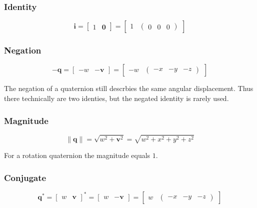 \documentclass[a4paper,11pt]{article}
\begin{document}
\subsubsection{Identity}

$$
\textbf{i}=\begin{bmatrix}
	1 & \textbf{0}
\end{bmatrix}=\begin{bmatrix}
	1 & \begin{pmatrix}
		0 & 0 & 0
	\end{pmatrix}
\end{bmatrix}
$$

\subsubsection{Negation}

$$-\textbf{q}=\begin{bmatrix}
	-w & -\textbf{v}
\end{bmatrix}=\begin{bmatrix}
	-w & \begin{pmatrix}
		-x & -y & -z
	\end{pmatrix}
\end{bmatrix}$$

The negation of a quaternion still descrbies the same angular displacement. Thus there technically are two identies, but the negated identity is rarely used.

\subsubsection{Magnitude}

$$\|\textbf{q}\|=\sqrt{w^2+\textbf{v}^2}=\sqrt{w^2+x^2+y^2+z^2}$$

For a rotation quaternion the magnitude equals $1$.

\subsubsection{Conjugate}

$$\textbf{q}^*=\begin{bmatrix}
	w & \textbf{v}
\end{bmatrix}^*=\begin{bmatrix}
	w & -\textbf{v}
\end{bmatrix}=\begin{bmatrix}
	w & \begin{pmatrix}
		-x & -y & -z
	\end{pmatrix}
\end{bmatrix}$$
\end{document}
